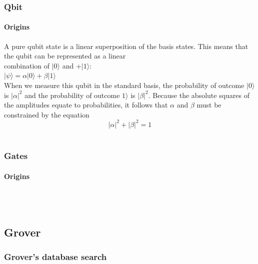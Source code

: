 \begin{frame}
	\frametitle{Qbit}
		\framesubtitle{Origins}
		\vspace{-1cm}
	{\normalsize
	A pure qubit state is a linear superposition of the basis states. This means that the qubit can be represented as a linear\\ combination of $|0\rangle$ and +$|1\rangle $:\\ 
    $|\psi \rangle =\alpha |0\rangle +\beta |1\rangle$\\
  
    When we measure this qubit in the standard basis, the probability of outcome $|0\rangle$  is $|\alpha |^{2}$ and the probability of outcome $1\rangle$  is $|\beta |^{2}$. Because the absolute squares of the amplitudes equate to probabilities, it follows that
     $\alpha$ and $\beta$ must be constrained by the equation
$$|\alpha |^{2}+|\beta |^{2}=1$$\\
	}
\end{frame}

\begin{frame}
	\frametitle{Gates}
		\framesubtitle{Origins}
		\vspace{-1cm}
	{\normalsize
	\hspace{0.5cm}{In quantum computing and specifically the quantum circuit model of computation, a quantum gate (or quantum logic gate) is a basic quantum circuit operating on a small number of qubits.}\\
	\vspace{0.4cm}
	\hspace{0.5cm}{.}\\
	}
\end{frame}


\subsection{Grover} 
\begin{frame}
	\frametitle{Grover's database search}
		\framesubtitle{}

		{\normalsize
		\\
		}
		

\end{frame}

